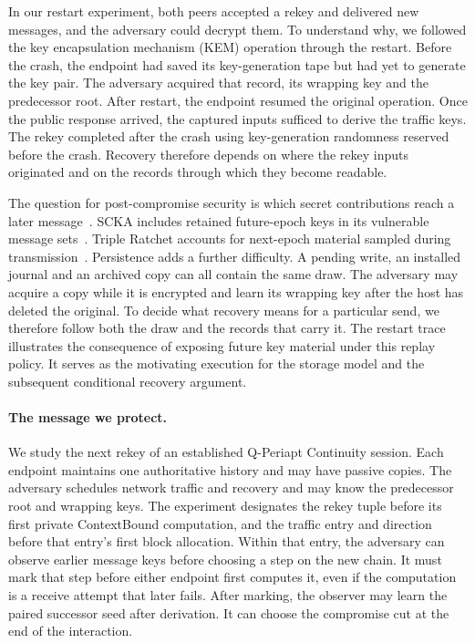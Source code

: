 \documentclass[pdflatex]{sn-jnl}
\theoremstyle{thmstyleone}
\theoremstyle{thmstylethree}
\theoremstyle{thmstyletwo}
\begin{document}
In our restart experiment, both peers accepted a rekey and delivered new
messages, and the adversary could decrypt them. To understand why, we
followed the key encapsulation mechanism (KEM) operation through the
restart. Before the crash, the endpoint had saved its key-generation
tape but had yet to generate the key pair. The adversary acquired that
record, its wrapping key and the predecessor root. After restart, the
endpoint resumed the original operation. Once the public response
arrived, the captured inputs sufficed to derive the traffic keys.
The rekey completed after the crash using key-generation randomness
reserved before the crash. Recovery therefore depends on where the rekey
inputs originated and on the records through which they become readable.

The question for post-compromise security is which secret contributions
reach a later message~\cite{signal2020,tripleratchet2025}. SCKA includes
retained future-epoch keys in its vulnerable message sets~\cite{scka2025}.
Triple Ratchet accounts for next-epoch material sampled during
transmission~\cite{tripleratchet2025}. Persistence adds a further
difficulty. A pending write, an installed journal and an archived copy
can all contain the same draw. The adversary may acquire a copy while
it is encrypted and learn its wrapping key after the host has deleted
the original. To decide what recovery means for a particular send, we
therefore follow both the draw and the records that carry it.
The restart trace illustrates the consequence of exposing future key
material under this replay policy. It serves as the motivating execution
for the storage model and the subsequent conditional recovery argument.

\paragraph{The message we protect.}
We study the next rekey of an established Q-Periapt Continuity session.
Each endpoint maintains one authoritative history and may have passive
copies. The adversary schedules network traffic and recovery and may
know the predecessor root and wrapping keys. The experiment designates
the rekey tuple before its first private ContextBound computation, and
the traffic entry and direction before that entry's first block allocation.
Within that entry, the adversary can observe earlier message keys before
choosing a step on the new chain. It must mark
that step before either endpoint first computes it, even if the
computation is a receive attempt that later fails. After marking, the
observer may learn the paired successor seed after derivation. It can choose the
compromise cut at the end of the interaction.
\end{document}
